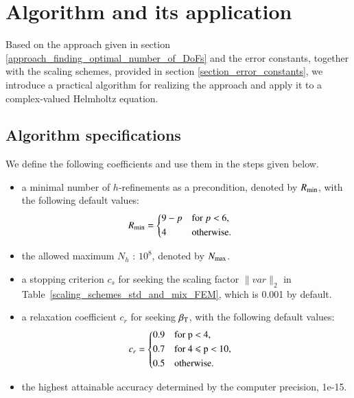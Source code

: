 \documentclass[review,3p]{elsarticle}
\begin{document}
\section{Algorithm and its application}     \label{section_algorithm_application}

Based on the approach given in section \ref{approach_finding_optimal_number_of_DoFs} and the error constants, together with the scaling schemes, provided in section \ref{section_error_constants}, we introduce a practical algorithm for realizing the approach and apply it to a complex-valued Helmholtz equation.

\subsection{Algorithm specifications}

We define the following coefficients and use them in the steps given below.

\begin{itemize}
  \renewcommand\labelitemi{--}
  \item a minimal number of $h$-refinements as a precondition, denoted by $R_{\rm min}$, with the following default values:
  \begin{equation}
  \begin{aligned}
      R_{\rm min} &=
      \begin{cases*}
	9-p & for $p <$ 6, \\
	4 & otherwise.
      \end{cases*}
  \end{aligned}
  \end{equation} 
  \item the allowed maximum $N_h$ : $10^8$, denoted by $N_{\rm max}$.  
  \item a stopping criterion $c_s$ for seeking the scaling factor $\|var\|_{2}$ in Table~\ref{scaling_schemes_std_and_mix_FEM}, which is 0.001 by default.
  \item a relaxation coefficient $c_r$ for seeking $\beta_{\rm T}$, with the following default values: 
    \begin{equation}
    \begin{aligned}
	c_r &=
	\begin{cases*}
	  0.9 & for p $<$ 4, \\
	  0.7 & for 4 $\leqslant$ p $<$ 10, \\
	  0.5 & otherwise.
	\end{cases*}
    \end{aligned}
    \end{equation}  
  \item the highest attainable accuracy determined by the computer precision, 1e-15.
\end{itemize}
\end{document}
